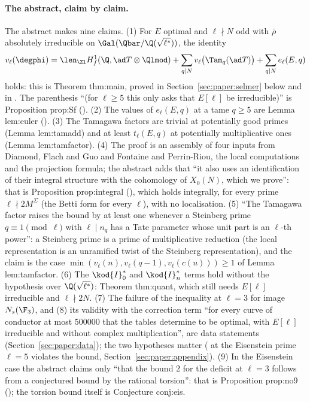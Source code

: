 \begin{sloppypar}
\paragraph{The abstract, claim by claim.} The abstract makes nine claims. (1) For $E$ optimal and $\ell\nmid N$ odd with $\bar\rho$ absolutely irreducible
on $\Gal(\Qbar/\Q(\sqrt{\ell^*}))$, the identity
\[
v_\ell(\degphi)=\len_{\Zl}H^1_f(\Q,\ad T\otimes\Qlmod)+\sum_{q\mid N}v_\ell\bigl(\Tam_q(\ad T)\bigr)+\sum_{q\mid N}e_\ell(E,q)
\]
holds: this is Theorem thm:main, proved in Section~\ref{sec:paper:selmer} below and in . The parenthesis ``(for $\ell\ge5$ this only asks that
$E[\ell]$ be irreducible)'' is Proposition prop:Sf (). (2) The values of $e_\ell(E,q)$ at a tame $q\ge5$ are Lemma lem:euler (). (3) The
Tamagawa factors are trivial at potentially good primes (Lemma lem:tamadd) and at least $t_\ell(E,q)$ at potentially multiplicative ones (Lemma lem:tamfactor). (4) The
proof is an assembly of four inputs from Diamond, Flach and Guo and Fontaine and Perrin-Riou, the local computations and the projection formula; the abstract
adds that ``it also uses an identification of their integral structure with the cohomology of $X_0(N)$, which we prove'': that is Proposition prop:integral
(), which holds integrally, for every prime $\ell\nmid2M^\Sigma$ (the Betti form for every $\ell$), with no localisation. (5) ``The Tamagawa factor raises the bound by at least one whenever a Steinberg prime
$q\equiv1\pmod\ell$ with $\ell\mid n_q$ has a Tate parameter whose unit part is an $\ell$-th power'': a Steinberg prime is a prime of multiplicative reduction (the
local representation is an unramified twist of the Steinberg representation), and the claim is the case $\min(v_\ell(n),v_\ell(q-1),v_\ell(c(u)))\ge1$ of Lemma
lem:tamfactor. (6) The $\kod{I}_0^*$ and $\kod{I}_n^*$ terms hold without the hypothesis over $\Q(\sqrt{\ell^*})$: Theorem thm:quant, which still needs $E[\ell]$ irreducible and
$\ell\nmid2N$. (7) The failure of the inequality at $\ell=3$ for image $N_s(\F_3)$, and (8) its validity with the correction term ``for every curve of conductor at most
$500000$ that the tables determine to be optimal, with $E[\ell]$ irreducible and without complex multiplication'', are data statements (Section~\ref{sec:paper:data});
the two hypotheses matter ( at the Eisenstein prime $\ell=5$ violates the bound, Section~\ref{sec:paper:appendix}). (9) In the Eisenstein case the
abstract claims only ``that the bound $2$ for the deficit at $\ell=3$ follows from a conjectured bound by the rational torsion'': that is Proposition prop:no9
(); the torsion bound itself is Conjecture conj:eis.


\end{sloppypar}
